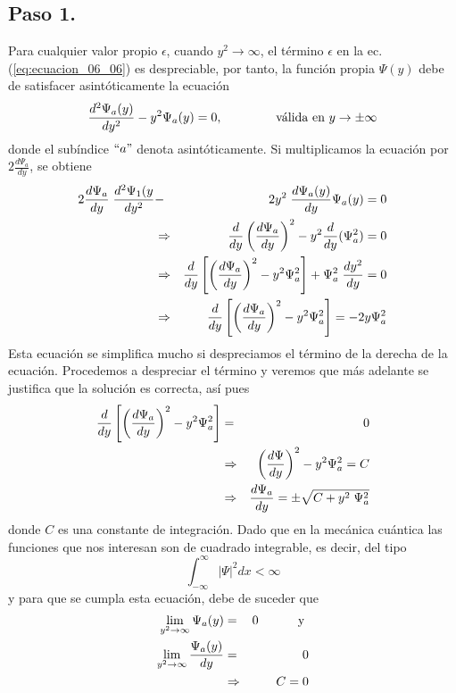 \subsection*{Paso 1.}
Para cualquier valor propio $\epsilon$, cuando $y^{2} \to \infty$, el término $\epsilon$ en la ec. (\ref{eq:ecuacion_06_06}) es despreciable, por tanto, la función propia $\Psi (y)$ debe de satisfacer asintóticamente la ecuación
\begin{equation}
\dfrac{d^{2} \Psi_{a} (y)}{d y^{2}} - y^{2} \Psi_{a} (y) = 0, \hspace{1.5cm} \text{válida en } y \to \pm \infty
\label{eq:ecuacion_06_07} 
\end{equation}
donde el subíndice $``a"$ denota asintóticamente. Si multiplicamos la ecuación por $2 \frac{d \Psi_{a}}{d y}$, se obtiene
\begin{eqnarray*}
2 \dfrac{d \Psi_{a}}{d y} \; \dfrac{d^{2} \Psi_{1} (y}{d y^{2}} &-& 2 y^{2} \; \dfrac{d \Psi_{a} (y)}{dy} \Psi_{a} (y) = 0  \nonumber \\
&\Rightarrow & \dfrac{d}{d y} \left(\dfrac{d \Psi_{a}}{d y} \right)^{2} - y^{2} \dfrac{d}{d y} (\Psi^{2}_{a}) = 0 \nonumber \\
&\Rightarrow & \dfrac{d}{d y} \left[ \left( \dfrac{d \Psi_{a}}{d y} \right)^{2} - y^{2} \Psi_{a}^{2} \right] + \Psi^{2}_{a} \; \dfrac{d y^{2}}{d y} = 0 \nonumber \\
&\Rightarrow & \dfrac{d}{d y} \left[ \left( \dfrac{d \Psi_{a}}{d y} \right)^{2} - y^{2} \Psi_{a}^{2} \right] = - 2 y \Psi^{2}_{a}
\end{eqnarray*}
Esta ecuación se simplifica mucho si despreciamos el término de la derecha de la ecuación. Procedemos a despreciar el término y veremos que más adelante se justifica que la solución es correcta, así pues
\begin{eqnarray*}
\dfrac{d}{d y} \left[ \left( \dfrac{d \Psi_{a}}{d y} \right)^{2} - y^{2} \Psi^{2}_{a} \right] &=& 0 \nonumber \\
& \Rightarrow & \left( \dfrac{d \Psi}{d y} \right)^{2} - y^{2} \Psi^{2}_{a} =  C \nonumber \\
& \Rightarrow & \dfrac{d \Psi_{a}}{dy} = \pm \sqrt{C + y^{2} \; \Psi^{2}_{a}}
\end{eqnarray*}
donde $C$ es una constante de integración. Dado que en la mecánica cuántica las funciones que nos interesan son de cuadrado integrable, es decir, del tipo
\begin{equation}
\int_{- \infty}^{\infty} \vert \Psi \vert^{2} dx < \infty
\label{eq:ecuacion_03_16}
\end{equation}
y para que se cumpla esta ecuación, debe de suceder que
\begin{eqnarray*}
\lim_{y^{2} \to \infty} \Psi_{a} (y) &=& 0 \hspace{1cm} \text{ y } \nonumber \\
\lim_{y^{2} \to \infty} \dfrac{\Psi_{a} (y)}{d y} &=& 0 \nonumber \\
&\Rightarrow & C = 0
\end{eqnarray*}
